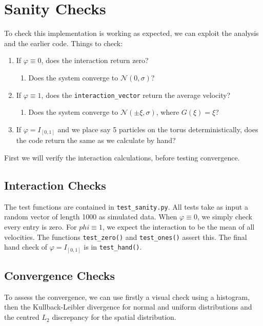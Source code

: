 \documentclass[11pt,a4paper, final, dvipsnames]{article}
\renewcommand{\phi}{\varphi}
\begin{document}
    \section{Sanity Checks}
        To check this implementation is working as expected, we can exploit the analysis and the earlier code. Things to check:
        \begin{enumerate}
            \item If $\phi\equiv 0$, does the interaction return zero?
            \begin{enumerate}
                 \item  Does the system converge to $\mathcal{N}(0,\sigma)$?
            \end{enumerate}
            \item If $\phi \equiv 1$, does the \texttt{interaction\_vector} return the average velocity?
            \begin{enumerate}
                 \item  Does the system converge to $\mathcal{N}(\pm \xi,\sigma)$, where $G(\xi)=\xi$? 
            \end{enumerate}
            \item If $\phi = I_{[0,1]}$ and we place say 5 particles on the torus deterministically, does the code return the same as we calculate by hand?
        \end{enumerate}
        First we will verify the interaction calculations, before testing convergence.
        
        \subsection{Interaction Checks}
        The test functions are contained in \verb|test_sanity.py|. All tests take as input a random vector of length 1000 as simulated data. When $\phi \equiv 0$, we simply check every entry is zero. For $phi \equiv 1$, we expect the interaction to be the mean of all velocities. The functions \verb|test_zero()| and \verb|test_ones()| assert this. The final hand check of $\phi = I_{[0,1]}$ is in \verb|test_hand()|.
        
        \subsection{Convergence Checks}
        To assess the convergence, we can use firstly a visual check using a histogram, then the Kullback-Leibler divergence for normal and uniform distributions and the centred $L_2$ discrepancy for the spatial distribution.
        
\end{document}
